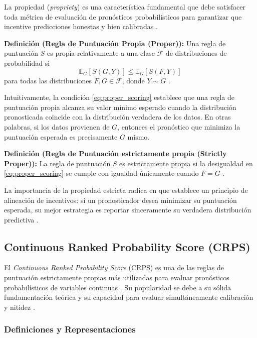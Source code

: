 La propiedad (\textit{propriety}) es una característica fundamental que debe satisfacer toda métrica de evaluación de pronósticos probabilísticos para garantizar que incentive predicciones honestas y bien calibradas \parencite{GneitingRaftery2007}.

\textbf{Definición (Regla de Puntuación Propia (Proper)):} Una regla de puntuación $S$ es propia relativamente a una clase $\mathcal{F}$ de distribuciones de probabilidad si
\begin{equation}
\mathbb{E}_G[S(G, Y)] \leq \mathbb{E}_G[S(F, Y)]
\label{eq:proper_scoring}
\end{equation}
para todas las distribuciones $F, G \in \mathcal{F}$, donde $Y \sim G$ \parencite{GneitingRaftery2007, Thorarinsdottir2017}. 

Intuitivamente, la condición \eqref{eq:proper_scoring} establece que una regla de puntuación propia alcanza su valor mínimo esperado cuando la distribución pronosticada coincide con la distribución verdadera de los datos. En otras palabras, si los datos provienen de $G$, entonces el pronóstico que minimiza la puntuación esperada es precisamente $G$ mismo.

\textbf{Definición (Regla de Puntuación estrictamente propia (Strictly Proper)):} La regla de puntuación $S$ es estrictamente propia si la desigualdad en \eqref{eq:proper_scoring} se cumple con igualdad únicamente cuando $F = G$ \parencite{GneitingRaftery2007}.

La importancia de la propiedad estricta radica en que establece un principio de alineación de incentivos: si un pronosticador desea minimizar su puntuación esperada, su mejor estrategia es reportar sinceramente su verdadera distribución predictiva \parencite{GneitingRaftery2007}. 

\subsection{Continuous Ranked Probability Score (CRPS)}
\label{subsec:crps}

El \textit{Continuous Ranked Probability Score} (CRPS) es una de las reglas de puntuación estrictamente propias más utilizadas para evaluar pronósticos probabilísticos de variables continuas \parencite{Gneiting2014}. Su popularidad se debe a su sólida fundamentación teórica y su capacidad para evaluar simultáneamente calibración y nitidez \parencite{GneitingRaftery2007, Thorarinsdottir2017}.

\subsubsection{Definiciones y Representaciones}


